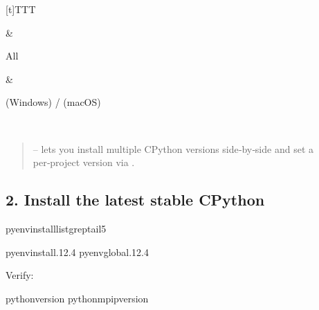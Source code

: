 \documentclass[a4paper,11pt,english]{sphinxmanual}
\begin{document}
\begin{savenotes}
\begin{tabulary}{\linewidth}[t]{TTT}
\begin{varwidth}[t]{}
\sphinxbeforeendvarwidth
\end{varwidth}%
&\begin{varwidth}[t]{}
\sphinxAtStartPar
All
\sphinxbeforeendvarwidth
\end{varwidth}%
&\begin{varwidth}[t]{}
\sphinxAtStartPar
{} (Windows) /  (macOS)
\sphinxbeforeendvarwidth
\end{varwidth}%
\\
\sphinxbottomrule
\end{tabulary}
\sphinxtableafterendhook\par
\sphinxattableend\end{savenotes}
\begin{quote}

\sphinxAtStartPar
{} –  lets you install multiple CPython versions side‑by‑side and set a per‑project version via .
\end{quote}


\subsection{2. Install the latest stable CPython}
\label{\detokenize{getting_started/installation:install-the-latest-stable-cpython}}
\begin{sphinxVerbatim}[commandchars=\\\{\}]
pyenvinstall\PYGZhy{}\PYGZhy{}listgrep\PYGZdl{}tail\PYGZhy{}5

pyenvinstall.12.4
pyenvglobal.12.4
\end{sphinxVerbatim}

\sphinxAtStartPar
Verify:

\begin{sphinxVerbatim}[commandchars=\\\{\}]
python\PYGZhy{}\PYGZhy{}version
python\PYGZhy{}mpip\PYGZhy{}\PYGZhy{}version
\end{sphinxVerbatim}
\end{document}
